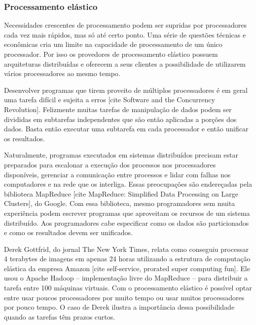 \subsubsection{Processamento elástico}

Necessidades crescentes de processamento podem ser supridas por processadores cada vez mais rápidos, mas só até certo ponto. Uma série de questões técnicas e econômicas cria um limite na capacidade de processamento de um único processador. Por isso os provedores de processamento elástico possuem arquiteturas distribuídas e oferecem a seus clientes a possibilidade de utilizarem vários processadores ao mesmo tempo.


Desenvolver programas que tirem proveito de múltiplos processadores é em geral uma tarefa difícil e sujeita a erros [cite Software and the Concurrency Revolution]. Felizmente muitas tarefas de manipulação de dados podem ser divididas em subtarefas independentes que são então aplicadas a porções dos dados. Basta então executar uma subtarefa em cada processador e então unificar os resultados. 

Naturalmente, programas executados em sistemas distribuídos precisam estar preparados para escalonar a execução dos processos nos processadores disponíveis, gerenciar a comunicação entre processos e lidar com falhas nos computadores e na rede que os interliga. Essas preocupações são endereçadas pela biblioteca MapReduce [cite MapReduce: Simplified Data Processing on Large Clusters], do Google. Com essa biblioteca, mesmo programadores sem muita experiência podem escrever programas que aproveitam os recursos de um sistema distribuído. Aos programadores cabe especificar como os dados são particionados e como os resultados devem ser unificados.

Derek Gottfrid, do jornal The New York Times, relata como conseguiu processar 4 terabytes de imagens em apenas 24 horas utilizando a estrutura de computação elástica da empresa Amazon [cite self-service, prorated super computing fun]. Ele usou o Apache Hadoop -- implementação livre do MapReduce -- para distribuir a tarefa entre 100 máquinas virtuais. Com o processamento elástico é possível optar entre usar poucos processadores por muito tempo ou usar muitos processadores por pouco tempo. O caso de Derek ilustra a importância dessa possibilidade quando as tarefas têm prazos curtos. 

